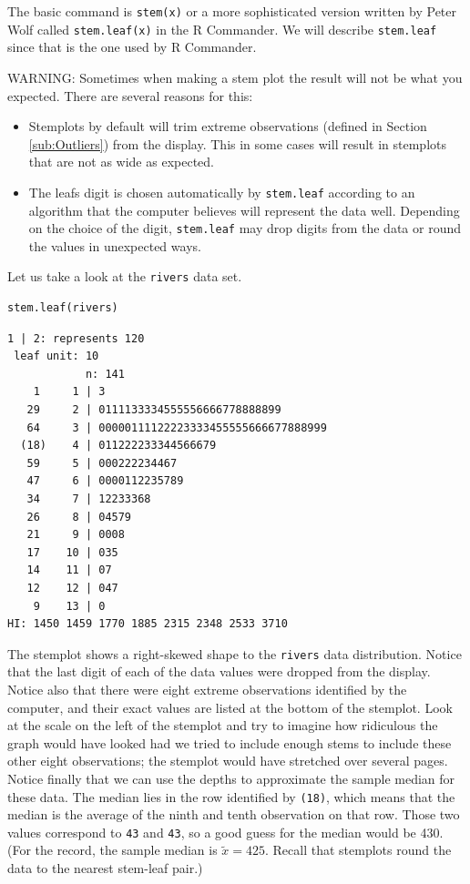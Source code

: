 \documentclass[captions=tableheading]{scrbook}
\begin{document}
The basic command is \texttt{stem(x)} or a more sophisticated version written by Peter Wolf called \texttt{stem.leaf(x)} in the \textsf{R} Commander. We will describe \texttt{stem.leaf} since that is the one used by \textsf{R} Commander.


WARNING: Sometimes when making a stem plot the result will not be what you expected. There are several reasons for this: 

\begin{itemize}
\item Stemplots by default will trim extreme observations (defined in Section \ref{sub:Outliers}) from the display. This in some cases will result in stemplots that are not as wide as expected.
\item The leafs digit is chosen automatically by \texttt{stem.leaf} according to an algorithm that the computer believes will represent the data well. Depending on the choice of the digit, \texttt{stem.leaf} may drop digits from the data or round the values in unexpected ways.
\end{itemize}

Let us take a look at the \texttt{rivers} data set\label{ite:stemplot-rivers}.


\begin{verbatim}
stem.leaf(rivers)
\end{verbatim}


\begin{verbatim}
1 | 2: represents 120
 leaf unit: 10
            n: 141
    1     1 | 3
   29     2 | 0111133334555556666778888899
   64     3 | 00000111122223333455555666677888999
  (18)    4 | 011222233344566679
   59     5 | 000222234467
   47     6 | 0000112235789
   34     7 | 12233368
   26     8 | 04579
   21     9 | 0008
   17    10 | 035
   14    11 | 07
   12    12 | 047
    9    13 | 0
HI: 1450 1459 1770 1885 2315 2348 2533 3710
\end{verbatim}

The stemplot shows a right-skewed shape to the \texttt{rivers} data distribution. Notice that the last digit of each of the data values were dropped from the display. Notice also that there were eight extreme observations identified by the computer, and their exact values are listed at the bottom of the stemplot. Look at the scale on the left of the stemplot and try to imagine how ridiculous the graph would have looked had we tried to include enough stems to include these other eight observations; the stemplot would have stretched over several pages. Notice finally that we can use the depths to approximate the sample median for these data. The median lies in the row identified by \texttt{(18)}, which means that the median is the average of the ninth and tenth observation on that row. Those two values correspond to \texttt{43} and \texttt{43}, so a good guess for the median would be 430. (For the record, the sample median is \(\widetilde{x}=425\). Recall that stemplots round the data to the nearest stem-leaf pair.) 
\end{document}

